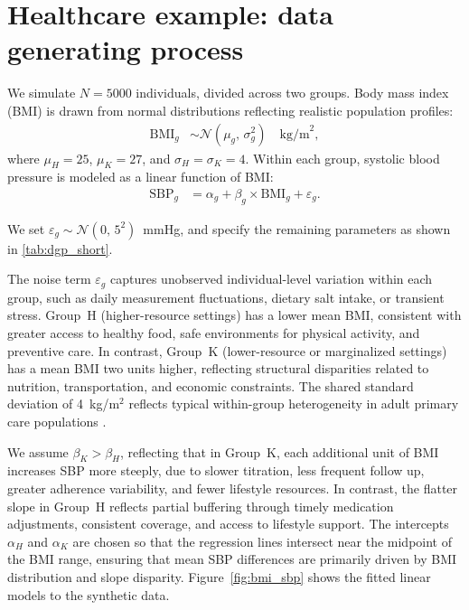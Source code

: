 
\section{Healthcare example: data generating process} %
\label{appendix:dgp}
We simulate \( N = 5000 \) individuals, divided across two groups. Body mass index (BMI) is drawn from normal distributions reflecting realistic population profiles:
\begin{align*}
    \text{BMI}_g &\sim \mathcal{N}(\mu_g ,\, \sigma_g^2) \quad \text{kg/m}^2,
\end{align*}
where \( \mu_H = 25 \), \( \mu_K = 27 \), and \( \sigma_H = \sigma_K = 4 \). Within each group, systolic blood pressure is modeled as a linear function of BMI:
\begin{align}
    \text{SBP}_g &= \alpha_g + \beta_g \times \text{BMI}_g + \varepsilon_g.
\end{align}

We set \( \varepsilon_g \sim \mathcal{N}(0,\, 5^2) \)~mmHg, and specify the remaining parameters as shown in \cref{tab:dgp_short}.

\noindent The noise term \( \varepsilon_g \) captures unobserved individual-level variation within each group, such as daily measurement fluctuations, dietary salt intake, or transient stress. 
Group~H (higher-resource settings) has a lower mean BMI, consistent with greater access to healthy food, safe environments for physical activity, and preventive care. 
In contrast, Group~K (lower-resource or marginalized settings) has a mean BMI two units higher, reflecting structural disparities related to nutrition, transportation, and economic constraints. 
The shared standard deviation of 4~kg/m\(^2\) reflects typical within-group heterogeneity in adult primary care populations \citep{block2013population}.

We assume \( \beta_K > \beta_H \), reflecting that in Group~K, each additional unit of BMI increases SBP more steeply, due to slower titration, less frequent follow up, greater adherence variability, and fewer lifestyle resources.
In contrast, the flatter slope in Group~H reflects partial buffering through timely medication adjustments, consistent coverage, and access to lifestyle support.
The intercepts \( \alpha_H \) and \( \alpha_K \) are chosen so that the regression lines intersect near the midpoint of the BMI range, ensuring that mean SBP differences are primarily driven by BMI distribution and slope disparity.
Figure~\ref{fig:bmi_sbp} shows the fitted linear models to the synthetic data.

